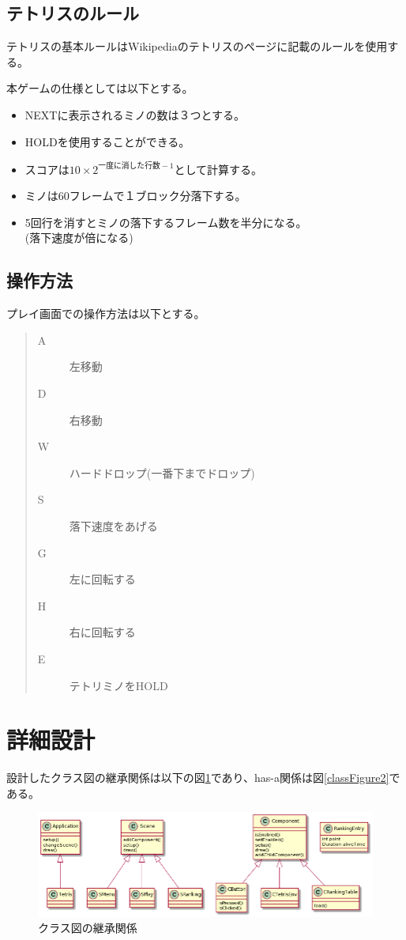 \documentclass[a4paper,11pt]{jsarticle}
\begin{document}
\subsection{テトリスのルール}
テトリスの基本ルールはWikipediaのテトリスのページ\cite{c0}に記載のルールを使用する。\par
本ゲームの仕様としては以下とする。
\begin{itemize}
  \item NEXTに表示されるミノの数は３つとする。
  \item HOLDを使用することができる。
  \item スコアは$10 \times 2^{一度に消した行数-1}$として計算する。
  \item ミノは60フレームで１ブロック分落下する。
  \item 5回行を消すとミノの落下するフレーム数を半分になる。\\(落下速度が倍になる)
\end{itemize}

\subsection{操作方法}
プレイ画面での操作方法は以下とする。
\begin{quote}
  \begin{description}
    \item[A] 左移動
    \item[D] 右移動
    \item[W] ハードドロップ(一番下までドロップ)
    \item[S] 落下速度をあげる
    \item[G] 左に回転する
    \item[H] 右に回転する
    \item[E] テトリミノをHOLD      
  \end{description}
\end{quote}

\section{詳細設計}
設計したクラス図の継承関係は以下の図\ref{classFigure}であり、has-a関係は図\ref{classFigure2}である。
\begin{figure}[H]
\begin{center}
\includegraphics[width=\textwidth]{class.png}
\caption{クラス図の継承関係}
\label{classFigure}
\end{center}
\end{figure}
\end{document}
